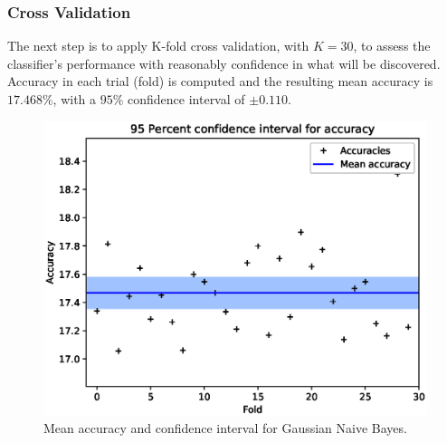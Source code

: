 \documentclass[a4paper, 10pt]{article}
\begin{document}
\subsubsection{Cross Validation}
The next step is to apply K-fold cross validation, with $K=30$, to assess the classifier's performance with reasonably confidence in what will be discovered. Accuracy in each trial (fold) is computed and the resulting mean accuracy is $17.468\%$, with a $95\%$ confidence interval of $\pm 0.110$. 

\begin{figure}[h!]
 \centering
 \includegraphics[width=0.8\linewidth]{pictures/nb_gaussian_accuracy_interval.eps}
 \caption{Mean accuracy and confidence interval for Gaussian Naive Bayes.}
 \label{fig:acc_int_gnb}
\end{figure}
\end{document}
